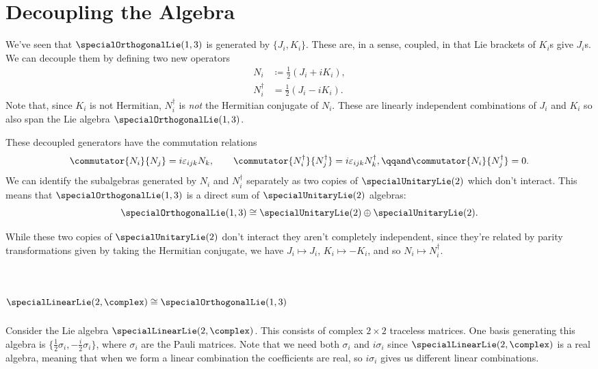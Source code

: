 \documentclass[fleqn]{NotesClass}
\newcommand{\isomorphic}{\cong}
\newcommand{\hermit}{\dagger}
\begin{document}
    \section{Decoupling the Algebra}
    We've seen that \(\specialOrthogonalLie(1, 3)\) is generated by \(\{J_i, K_i\}\).
    These are, in a sense, coupled, in that Lie brackets of \(K_i\)s give \(J_i\)s.
    We can decouple them by defining two new operators
    \begin{align}
        N_i &\coloneqq \frac{1}{2}(J_i + i K_i),\\
        N_i^\hermit &= \frac{1}{2}(J_i - i K_i).
    \end{align}
    Note that, since \(K_i\) is not Hermitian, \(N_i^\hermit\) is \emph{not} the Hermitian conjugate of \(N_i\).
    These are linearly independent combinations of \(J_i\) and \(K_i\) so also span the Lie algebra \(\specialOrthogonalLie(1, 3)\).
    
    These decoupled generators have the commutation relations
    \begin{equation}
        \commutator{N_i}{N_j} = i\varepsilon_{ijk}N_k, \qquad \commutator{N_i^\hermit}{N_j^\hermit} = i\varepsilon_{ijk}N_k^\hermit, \qqand \commutator{N_i}{N_j^\hermit} = 0.
    \end{equation}
    We can identify the subalgebras generated by \(N_i\) and \(N_i^\hermit\) separately as two copies of \(\specialUnitaryLie(2)\) which don't interact.
    This means that \(\specialOrthogonalLie(1, 3)\) is a direct sum of \(\specialUnitaryLie(2)\) algebras:
    \begin{equation}
        \specialOrthogonalLie(1, 3) \isomorphic \specialUnitaryLie(2) \oplus \specialUnitaryLie(2).
    \end{equation}
    
    While these two copies of \(\specialUnitaryLie(2)\) don't interact they aren't completely independent, since they're related by parity transformations given by taking the Hermitian conjugate, we have \(J_i \mapsto J_i\), \(K_i \mapsto -K_i\), and so \(N_i \mapsto N_i^\hermit\).
    
    \section{\texorpdfstring{\(\specialLinearLie(2, \complex) \isomorphic \specialOrthogonalLie(1, 3)\)}{sl(2, C) isomorphic to so(1, 3)}}
    Consider the Lie algebra \(\specialLinearLie(2, \complex)\).
    This consists of complex \(2 \times 2\) traceless matrices.
    One basis generating this algebra is \(\{\tfrac{1}{2}\sigma_i, -\tfrac{i}{2}\sigma_i\}\), where \(\sigma_i\) are the Pauli matrices.
    Note that we need both \(\sigma_i\) and \(i\sigma_i\) since \(\specialLinearLie(2, \complex)\) is a real algebra, meaning that when we form a linear combination the coefficients are real, so \(i\sigma_i\) gives us different linear combinations.
    
\end{document}
